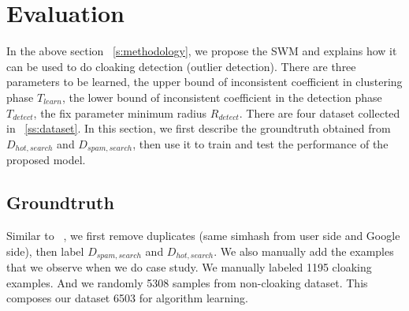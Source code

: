 \section{Evaluation}
\label{s:evaluation}



In the above section ~\autoref{s:methodology}, we propose the SWM and explains
how it can be used to do cloaking detection (outlier detection). There are three
parameters to be learned, the upper bound of inconsistent coefficient in
clustering phase $T_{learn}$, the lower bound of inconsistent coefficient in the detection
phase $T_{detect}$, the fix parameter minimum radius $R_{detect}$. 
There are four dataset collected in ~\autoref{ss:dataset}. In this section,
we first describe the groundtruth obtained from $D_{hot, search}$ and $D_{spam,
search}$, then use it to train and test the performance of the proposed model.

\subsection{Groundtruth}

Similar to ~\cite{lin2009detection}, we first remove duplicates (same simhash
from user side and Google side), then label $D_{spam, search}$ and $D_{hot,
search}$. We also manually add the examples that we observe when we do case
study. We manually labeled 1195 cloaking examples. And we randomly
 5308 samples from non-cloaking dataset. This composes our
dataset 6503 for algorithm learning.

%
%
%
%



